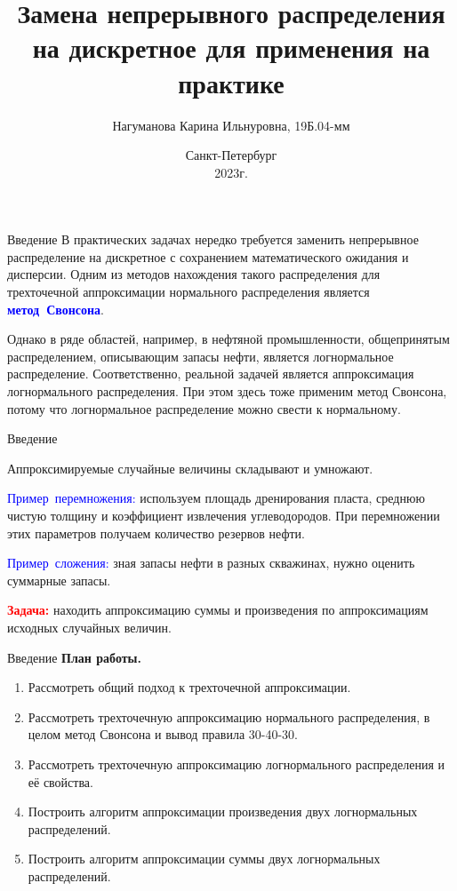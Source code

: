 \documentclass[ucs, notheorems, handout]{beamer}
\title[Замена непрерывного распределения]{Замена непрерывного распределения на дискретное для применения на практике}
\author[Нагуманова~К. И.]{ Нагуманова Карина Ильнуровна, 19Б.04-мм}
\date{\tiny{Санкт-Петербург\\ 2023г.}}
\institute[Санкт-Петербургский Государственный Университет]{%
	\small
	Санкт-Петербургский государственный университет\\
	Прикладная математика и информатика\\
	\vspace{1.25cm}}
\begin{document}
	
	\begin{frame}
		\titlepage
	\end{frame}

\begin{frame}{Введение}
	В практических задачах нередко требуется заменить непрерывное распределение на
	дискретное с сохранением математического ожидания и дисперсии. Одним из методов
	нахождения такого распределения для трехточечной аппроксимации нормального распределения является \textcolor{blue}{\hbox{\textbf{метод Свонсона}}}.
	
	\bigskip
	
	Однако в ряде областей, например, в нефтяной промышленности, общепринятым распределением, описывающим запасы нефти, является логнормальное распределение. 
	Соответственно, реальной задачей является аппроксимация логнормального распределения. При этом здесь тоже применим метод Свонсона, потому что логнормальное распределение можно свести к нормальному.
\end{frame}

\begin{frame}{Введение}
	
	Аппроксимируемые случайные величины складывают и умножают.
	
	\bigskip
	
	\textcolor{blue}{\hbox{Пример перемножения:}} используем площадь дренирования пласта, среднюю чистую толщину и коэффициент извлечения углеводородов. При перемножении этих параметров получаем количество резервов нефти.
	
	\bigskip
	
	\textcolor{blue}{\hbox{Пример сложения:}} зная запасы нефти в разных скважинах, нужно оценить суммарные запасы.
	
	\bigskip
	
	\textcolor{red}{\textbf{Задача:}} находить аппроксимацию суммы и произведения по аппроксимациям исходных случайных величин.
	
\end{frame}

\begin{frame}{Введение}
	\textbf{План работы.}
	\begin{enumerate}
		\item Рассмотреть общий подход к трехточечной аппроксимации.
		\item Рассмотреть трехточечную аппроксимацию нормального распределения, в целом метод Свонсона и вывод правила 30-40-30.
		\item Рассмотреть трехточечную аппроксимацию логнормального распределения и её  свойства.
		\item Построить алгоритм аппроксимации произведения двух логнормальных распределений.
		\item Построить алгоритм аппроксимации суммы двух логнормальных распределений.
	\end{enumerate}
\end{frame}
\end{document}
